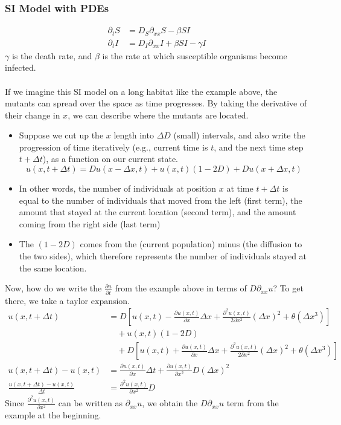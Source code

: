 \documentclass[10pt]{article}
\begin{document}
\subsubsection*{SI Model with PDEs}
\begin{align*}
    \partial_t S &= D_S \partial_{xx} S - \beta SI \\
    \partial_t I &= D_I \partial_{xx} I + \beta SI - \gamma I
\end{align*}
$\gamma$ is the death rate, and $\beta$ is the rate at which susceptible organisms become infected.\\\\
If we imagine this SI model on a long habitat like the example above, the mutants can spread over the space as time progresses.  By taking the derivative of their change in $x$, we can describe where the mutants are located.  
\begin{itemize}
    \item Suppose we cut up the $x$ length into $\Delta D$ (small) intervals, and also write the progression of time iteratively (e.g., current time is $t$, and the next time step $t + \Delta t$), as a function on our current state.
    \[u(x, t + \Delta t) = Du(x - \Delta x, t) + u(x, t)(1 - 2D) + D u(x + \Delta x, t)\]
    \item In other words, the number of individuals at position $x$ at time $t + \Delta t$ is equal to the number of individuals that moved from the left (first term), the amount that stayed at the current location (second term), and the amount coming from the right side (last term)
    \item The $(1 - 2D)$ comes from the (current population) minus (the diffusion to the two sides), which therefore represents the number of individuals stayed at the same location.
\end{itemize}
Now, how do we write the $\frac{\partial u}{\partial t}$ from the example above in terms of $D \partial_{xx} u$?  To get there, we take a taylor expansion.
\begin{align*}
    u(x, t + \Delta t) &= D\left[u(x, t) - \frac{\partial u(x, t)}{\partial x} \Delta x + \frac{\partial^2 u(x, t)}{2\partial x^2} (\Delta x)^2 + \theta(\Delta x^3)\right] \\
    &\quad + u(x, t)(1 - 2D) \\
    &\quad + D\left[u(x, t) + \frac{\partial u(x, t)}{\partial x} \Delta x + \frac{\partial^2 u(x, t)}{2\partial x^2} (\Delta x)^2 + \theta(\Delta x^3)\right]\\
    u(x, t + \Delta t) - u(x, t) &= \frac{\partial u(x, t)}{\partial x} \Delta t + \frac{\partial u(x, t)}{\partial x^2}D (\Delta x)^2\\
    \frac{u(x, t + \Delta t) - u(x, t)}{\Delta t} &= \frac{\partial^2 u(x, t)}{\partial x^2} D
\end{align*}
Since $\frac{\partial^2 u(x, t)}{\partial x^2}$ can be written as $\partial_{xx}u$, we obtain the $D\partial_{xx}u$ term from the example at the beginning.
\end{document}
